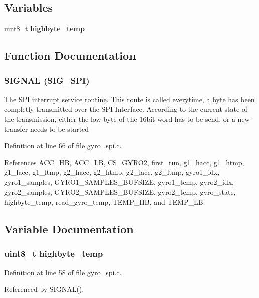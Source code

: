 \subsection*{Variables}
\begin{CompactItemize}
\item 
uint8\_\-t {\bf highbyte\_\-temp}
\end{CompactItemize}


\subsection{Function Documentation}
\subsubsection{\setlength{\rightskip}{0pt plus 5cm}SIGNAL (SIG\_\-SPI)}\label{gyro__spi_8c_734dd027fc9ababff59a6e870ee42a76}


The SPI interrupt service routine. This route is called everytime, a byte has been completly transmitted over the SPI-Interface. According to the current state of the transmission, either the low-byte of the 16bit word has to be send, or a new transfer needs to be started 

Definition at line 66 of file gyro\_\-spi.c.

References ACC\_\-HB, ACC\_\-LB, CS\_\-GYRO2, first\_\-run, g1\_\-hacc, g1\_\-htmp, g1\_\-lacc, g1\_\-ltmp, g2\_\-hacc, g2\_\-htmp, g2\_\-lacc, g2\_\-ltmp, gyro1\_\-idx, gyro1\_\-samples, GYRO1\_\-SAMPLES\_\-BUFSIZE, gyro1\_\-temp, gyro2\_\-idx, gyro2\_\-samples, GYRO2\_\-SAMPLES\_\-BUFSIZE, gyro2\_\-temp, gyro\_\-state, highbyte\_\-temp, read\_\-gyro\_\-temp, TEMP\_\-HB, and TEMP\_\-LB.

\subsection{Variable Documentation}
\subsubsection{\setlength{\rightskip}{0pt plus 5cm}uint8\_\-t {\bf highbyte\_\-temp}}\label{gyro__spi_8c_a1d7fd7792fd6135e91c3228ff8cc102}




Definition at line 58 of file gyro\_\-spi.c.

Referenced by SIGNAL().